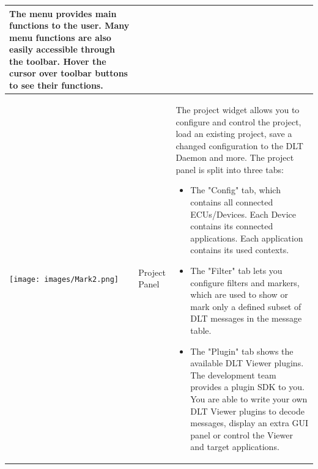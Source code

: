 \documentclass[a4paper,11pt]{article}
\begin{document}
\begin{longtable}{| l | m{3cm}  | m{11cm} |}
The menu provides main functions to the user. Many menu functions are also easily accessible through the toolbar.
Hover the cursor over toolbar buttons to see their functions. \\
   \hline

   \texttt{[image: images/Mark2.png]}
   &
    Project Panel
   &
   The project widget allows you to configure and control the project,
   load an existing project, save a changed configuration to the DLT Daemon and
   more. The project panel is split into three tabs:
   \begin{itemize}
    \item The "Config" tab, which contains all connected ECUs/Devices.
     Each Device contains its connected applications.
     Each application contains its used contexts.
    \item The "Filter" tab lets you configure filters and markers,
    which are used to show or
    mark only a defined subset of DLT messages in the message table.
    \item The "Plugin" tab shows the available DLT Viewer plugins. The development team provides a
    plugin SDK to you. You are able to write your own DLT Viewer plugins to decode
    messages, display an extra GUI panel or control the Viewer and target applications.
   \end{itemize}


\end{longtable}
\end{document}
